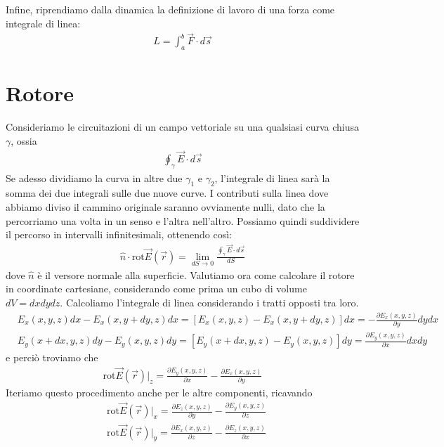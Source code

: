 \documentclass{book}
\begin{document}
Infine, riprendiamo dalla dinamica la definizione di lavoro di una forza come integrale di linea:
\begin{align*}
    L = \int _a^b \vec{F} \cdot  d\vec{s}
\end{align*}
\section{Rotore}
Consideriamo le circuitazioni di un campo vettoriale su una qualsiasi curva chiusa $\gamma$, ossia
\begin{align*}
    \oint_{\gamma} \vec{E} \cdot d\vec{s}
\end{align*}
Se adesso dividiamo la curva in altre due $\gamma_1$ e $\gamma_2$, l'integrale di linea sarà la somma dei due integrali sulle due nuove curve. I contributi sulla linea dove abbiamo diviso il cammino originale saranno ovviamente nulli, dato che la percorriamo una volta in un senso e l'altra nell'altro.
Possiamo quindi suddividere il percorso in intervalli infinitesimali, ottenendo così:
\begin{align*}
    \hat{n}\cdot \text{rot} \vec{E} (\vec{r}) = \lim _{dS\to 0} \frac{\oint_{\gamma} \vec{E} \cdot d\vec{s}}{dS}
\end{align*}
dove $\hat{n}$ è il versore normale alla superficie.
Valutiamo ora come calcolare il rotore in coordinate cartesiane, considerando come prima un cubo di volume $dV = dxdydz$. Calcoliamo l'integrale di linea considerando i tratti opposti tra loro.
\begin{align*}
   &E_x (x,y,z)dx- E_x (x, y+dy, z) dx = [ E_x (x, y, z) - E_x (x, y+dy, z )] dx = - \frac{\partial E_x (x,y,z)}{\partial y} dy dx \\
   & E_y (x+ dx, y, z)dy - E_y(x, y, z)dy =[E_y (x+dx, y, z) - E_y (x, y, z)] dy = \frac{\partial E_y (x,y,z)}{\partial x} dxdy
\end{align*}
e perciò troviamo che 
\begin{align*}
     \text{rot} \vec{E} (\vec{r})|_{z}  =\frac{\partial E_y (x,y,z)}{\partial x} - \frac{\partial E_x (x,y,z)}{\partial y}
\end{align*}
Iteriamo questo procedimento anche per le altre componenti, ricavando 
\begin{align*}
    &\text{rot} \vec{E} (\vec{r})|_{x} = \frac{\partial E_z (x,y,z)}{\partial y} - \frac{\partial E_y (x,y,z)}{\partial z} \\
    &\text{rot} \vec{E} (\vec{r})|_{y} = \frac{\partial E_x (x,y,z)}{\partial z} - \frac{\partial E_z (x,y,z)}{\partial x}
\end{align*}
\end{document}
